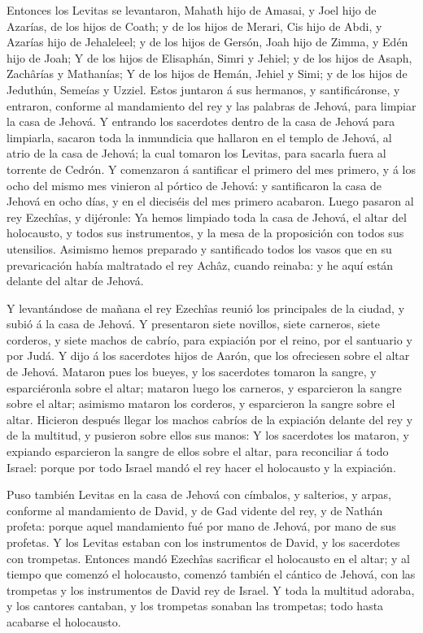 Entonces los Levitas se levantaron, Mahath hijo de Amasai,
y Joel hijo de Azarías, de los hijos de Coath; y de los hijos de Merari,
Cis hijo de Abdi, y Azarías hijo de Jehaleleel; y de los hijos de
Gersón, Joah hijo de Zimma, y Edén hijo de Joah;  Y de los
hijos de Elisaphán, Simri y Jehiel; y de los hijos de Asaph, Zachârías y
Mathanías;  Y de los hijos de Hemán, Jehiel y Simi; y de
los hijos de Jeduthún, Semeías y Uzziel.  Estos juntaron á
sus hermanos, y santificáronse, y entraron, conforme al mandamiento del
rey y las palabras de Jehová, para limpiar la casa de Jehová.
 Y entrando los sacerdotes dentro de la casa de Jehová para
limpiarla, sacaron toda la inmundicia que hallaron en el templo de
Jehová, al atrio de la casa de Jehová; la cual tomaron los Levitas, para
sacarla fuera al torrente de Cedrón.  Y comenzaron á
santificar el primero del mes primero, y á los ocho del mismo mes
vinieron al pórtico de Jehová: y santificaron la casa de Jehová en ocho
días, y en el dieciséis del mes primero acabaron.  Luego
pasaron al rey Ezechîas, y dijéronle: Ya hemos limpiado toda la casa de
Jehová, el altar del holocausto, y todos sus instrumentos, y la mesa de
la proposición con todos sus utensilios.  Asimismo hemos
preparado y santificado todos los vasos que en su prevaricación había
maltratado el rey Achâz, cuando reinaba: y he aquí están delante del
altar de Jehová.

 Y levantándose de mañana el rey Ezechîas reunió los
principales de la ciudad, y subió á la casa de Jehová.  Y
presentaron siete novillos, siete carneros, siete corderos, y siete
machos de cabrío, para expiación por el reino, por el santuario y por
Judá. Y dijo á los sacerdotes hijos de Aarón, que los ofreciesen sobre
el altar de Jehová.  Mataron pues los bueyes, y los
sacerdotes tomaron la sangre, y esparciéronla sobre el altar; mataron
luego los carneros, y esparcieron la sangre sobre el altar; asimismo
mataron los corderos, y esparcieron la sangre sobre el altar.
 Hicieron después llegar los machos cabríos de la expiación
delante del rey y de la multitud, y pusieron sobre ellos sus manos:
 Y los sacerdotes los mataron, y expiando esparcieron la
sangre de ellos sobre el altar, para reconciliar á todo Israel: porque
por todo Israel mandó el rey hacer el holocausto y la expiación.

 Puso también Levitas en la casa de Jehová con címbalos, y
salterios, y arpas, conforme al mandamiento de David, y de Gad vidente
del rey, y de Nathán profeta: porque aquel mandamiento fué por mano de
Jehová, por mano de sus profetas.  Y los Levitas estaban
con los instrumentos de David, y los sacerdotes con trompetas.
 Entonces mandó Ezechîas sacrificar el holocausto en el
altar; y al tiempo que comenzó el holocausto, comenzó también el cántico
de Jehová, con las trompetas y los instrumentos de David rey de Israel.
 Y toda la multitud adoraba, y los cantores cantaban, y los
trompetas sonaban las trompetas; todo hasta acabarse el holocausto.

